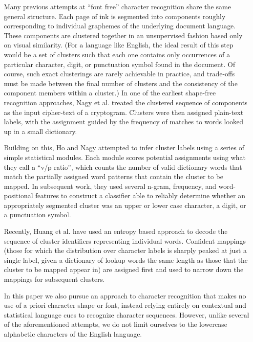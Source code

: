\documentclass[times, 10pt,twocolumn]{article}
\begin{document}
Many previous attempts at ``font free'' character recognition share
the same general structure. Each page of ink is segmented into components
roughly corresponding to individual graphemes of the 
underlying document language. These components are clustered together in an 
unsupervised fashion based only on visual similarity.  (For a language like 
English, the ideal result of this step would be a set of clusters such that
each one contains only occurrences of a particular 
character, digit, or punctuation symbol found in the document.
Of course, such exact clusterings are rarely achievable in practice, and 
trade-offs must be made between the final number of clusters and the 
consistency of the component members within a cluster.)
In one of the earliest shape-free recognition approaches, Nagy et al. treated
the clustered sequence of components as the input cipher-text of a 
cryptogram\cite{nagy1987}.  Clusters were then assigned plain-text labels, 
with the assignment guided by the frequency of matches to words looked up in a 
small dictionary.


Building on this, Ho and Nagy attempted to infer cluster labels using a series 
of simple statistical modules\cite{ho2000}.  Each module scores potential 
assignments using what they call a ``v/p ratio'', which counts the number of 
valid dictionary words that match the partially assigned word patterns that 
contain the cluster to be mapped.  In subsequent work, they used 
several n-gram, frequency, and word-positional features to construct a 
classifier able to reliably determine whether an appropriately segmented 
cluster was an upper or lower case character, a digit, or a 
punctuation symbol\cite{ho2001}.

Recently, Huang et al. have used an entropy based approach to decode the
sequence of cluster identifiers representing individual words\cite{huang2006}.  
Confident mappings (those for which the distribution over character labels is 
sharply peaked at just a single label, given a dictionary of lookup words the 
same length as those that the cluster to be mapped appear in) are assigned 
first and used to narrow down the mappings for subsequent clusters.


In this paper we also pursue an approach to character recognition that 
makes no use of a priori character shape or font, instead relying entirely on 
contextual and statistical language cues to recognize character sequences.  
However, unlike several of the aforementioned attempts, we do not limit 
ourselves to the lowercase alphabetic characters of the English language. 
\end{document}
